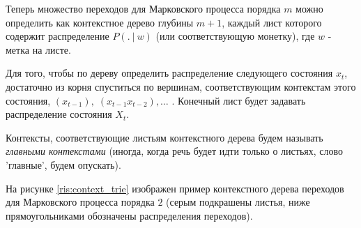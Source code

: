 \documentclass{matmex-diploma-custom}
\begin{document}
Теперь множество переходов для Марковского процесса порядка $ m $ можно определить как контекстное дерево глубины $ m+1 $, каждый лист которого содержит распределение $P(.~|~w)$ (или соответствующую монетку), где $ w $ - метка на листе.

Для того, чтобы по дереву определить распределение следующего состояния $ x_{t} $, достаточно из корня спуститься по вершинам, соответствующим контекстам этого состояния, $(x_{t-1}),\; (x_{t-1}x_{t-2}), \ldots$ . Конечный лист будет задавать распределение состояния $ X_{t} $.

Контексты, соответствующие листьям контекстного дерева будем называть \textit{главными контекстами} (иногда, когда речь будет идти только о листьях, слово 'главные', будем опускать).

На рисунке \ref{ris:context_trie} изображен пример контекстного дерева переходов для Марковского процесса порядка $ 2 $ (серым подкрашены листья, ниже прямоугольниками обозначены распределения переходов).
\end{document}
